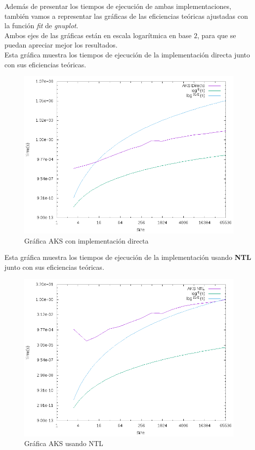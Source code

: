 Además de presentar los tiempos de ejecución de ambas implementaciones, también vamos a representar las gráficas de las eficiencias teóricas ajustadas con la función \textit{fit} de \textit{gnuplot}.\\

Ambos ejes de las gráficas están en escala logarítmica en base $2$, para que se puedan apreciar mejor los resultados.\\

Esta gráfica muestra los tiempos de ejecución de la implementación directa junto con sus eficiencias teóricas.

\begin{figure}[H]
	\centering
	\includegraphics[totalheight=12cm]{img/graphs/aks-direct-mean}
	\caption{Gráfica AKS con implementación directa}
\end{figure}

Esta gráfica muestra los tiempos de ejecución de la implementación usando \textbf{NTL} junto con sus eficiencias teóricas.

\begin{figure}[H]
	\centering
	\includegraphics[totalheight=12cm]{img/graphs/aks-ntl-mean}
	\caption{Gráfica AKS usando NTL}
\end{figure}

